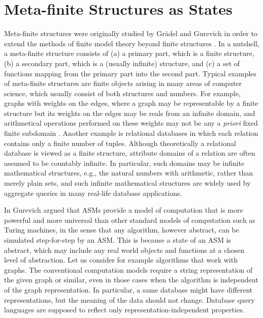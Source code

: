 \documentclass[preprint,11pt]{elsarticle}
\theoremstyle{definition}
\theoremstyle{remark}
\begin{document}
\section{Meta-finite Structures as States}\label{sec:states}

Meta-finite structures were originally studied by Gr{\"a}del and Gurevich in order to extend the methods of finite model theory beyond finite structures \cite{graedel:infcomp1998}. In a nutshell, a meta-finite structure consists of (a) a
primary part, which is a finite structure, (b) a secondary part, which is a (usually
infinite) structure, and
(c) a set of functions mapping from the primary part into the second part. Typical examples of meta-finite structures are finite objects arising in many areas of computer science, which usually consist of both structures and
numbers. For example, graphs with weights on the edges, where a graph may be representable by a finite structure but its weights on the edges may be reals from an infinite domain, and arithmetical operations performed on these weights may not be any a \emph{priori} fixed finite subdomain \cite{graedel:infcomp1998}. Another example is relational databases in which each relation contains only a finite number of tuples. Although theoretically a relational database is viewed as a finite structure, attribute domains of a relation are often assumed to be countably infinite. In particular, such domains may be infinite mathematical structures, e.g., the natural numbers with arithmetic, rather than merely plain sets, and such infinite mathematical structures are widely used by aggregate queries in many real-life database applications.


In \cite{Gurevich-New-Thesis} Gurevich argued that ASMs provide a model of computation that is more powerful and more universal than other standard models of computation such as Turing machines, in the sense that any algorithm, however abstract, can be simulated step-for-step by an ASM. This is because a state of an ASM is abstract, which may include any real world objects and functions at a chosen level of abstraction. Let us consider for example algorithms that work with graphs. The conventional computation models require a string representation of the given graph or similar,  even in those cases when the algorithm is independent of the graph representation. In particular, a same database might have different representations, but the meaning of the data should not change. Database query languages are supposed to reflect only representation-independent properties. 
\end{document}
